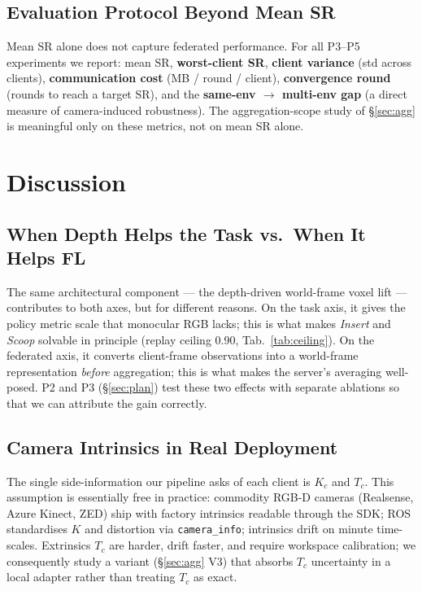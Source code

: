 \documentclass{article}
\begin{document}
\subsection{Evaluation Protocol Beyond Mean SR}
\label{sec:fl-metrics}
Mean SR alone does not capture federated performance. For all
P3--P5 experiments we report:
mean SR, \textbf{worst-client SR}, \textbf{client variance}
(std across clients), \textbf{communication cost} (MB / round /
client), \textbf{convergence round} (rounds to reach a target SR),
and the \textbf{same-env $\to$ multi-env gap} (a direct measure of
camera-induced robustness). The aggregation-scope study of
\S\ref{sec:agg} is meaningful only on these metrics, not on mean
SR alone.

\section{Discussion}
\label{sec:discussion}

\subsection{When Depth Helps the Task vs.\ When It Helps FL}
\label{sec:disc-task-vs-fl}
The same architectural component --- the depth-driven world-frame
voxel lift --- contributes to both axes, but for different reasons.
On the task axis, it gives the policy metric scale that monocular
RGB lacks; this is what makes \emph{Insert} and \emph{Scoop}
solvable in principle (replay ceiling 0.90, Tab.~\ref{tab:ceiling}).
On the federated axis, it converts client-frame observations into a
world-frame representation \emph{before} aggregation; this is what
makes the server's averaging well-posed. P2 and P3
(\S\ref{sec:plan}) test these two effects with separate ablations
so that we can attribute the gain correctly.

\subsection{Camera Intrinsics in Real Deployment}
\label{sec:fl-camera}
The single side-information our pipeline asks of each client is
$K_c$ and $T_c$. This assumption is essentially free in practice:
commodity RGB-D cameras (Realsense, Azure Kinect, ZED) ship with
factory intrinsics readable through the SDK; ROS standardises $K$
and distortion via \texttt{camera\_info}; intrinsics drift on
minute time-scales. Extrinsics $T_c$ are harder, drift faster, and
require workspace calibration; we consequently study a variant
(\S\ref{sec:agg} V3) that absorbs $T_c$ uncertainty in a local
adapter rather than treating $T_c$ as exact.
\end{document}
